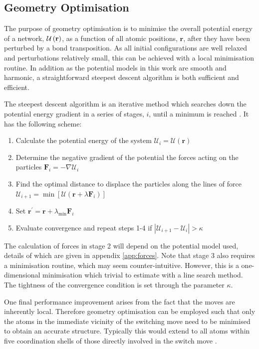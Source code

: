 \subsection{Geometry Optimisation}
\label{s:geomopt}

The purpose of geometry optimisation is to minimise the overall potential energy of a network, $\mathcal{U}\left(\mathbf{r}\right)$, as a function of all atomic positions, $\mathbf{r}$, after they have been perturbed \eg{} by a bond transposition.
As all initial configurations are well relaxed and perturbations relatively small, this can be achieved with a local minimisation routine.
In addition as the potential models in this work are smooth and harmonic, a straightforward steepest descent algorithm is both sufficient and efficient.

The steepest descent algorithm is an iterative method which searches down the potential energy gradient in a series of stages, $i$, until a minimum is reached \cite{Nocedal2006}.
It has the following scheme:
\begin{enumerate}
	\item Calculate the potential energy of the system $\mathcal{U}_i=\mathcal{U}\left(\mathbf{r}\right)$
	\item Determine the negative gradient of the potential \ie{} the forces acting on the particles $\mathbf{F}_i=-\nabla \mathcal{U}_i$ 
	\item Find the optimal distance to displace the particles along the lines of force $\mathcal{U}_{i+1}=\min \left[\mathcal{U}\left(\mathbf{r}+\lambda \mathbf{F}_i\right)\right]$
	\item Set $\mathbf{r}^{\prime}=\mathbf{r}+\lambda_{\text{min}} \mathbf{F}_i$
	\item Evaluate convergence and repeat steps 1-4 if $\left|\mathcal{U}_{i+1}-\mathcal{U}_i\right|>\kappa$
\end{enumerate}
The calculation of forces in stage 2 will depend on the potential model used, details of which are given in appendix \ref{app:forces}.
Note that stage 3 also requires a minimisation routine, which may seem counter\--intuitive. 
However, this is a one\--dimensional minimisation which trivial to estimate with a line search method.
The tightness of the convergence condition is set through the parameter $\kappa$.

One final performance improvement arises from the fact that the \mc{} moves are inherently local.
Therefore geometry optimisation can be employed such that only the atoms in the immediate vicinity of the switching move need to be minimised to obtain an accurate structure.
Typically this would extend to all atoms within five coordination shells of those directly involved in the switch move \cite{Mousseau2001}.

